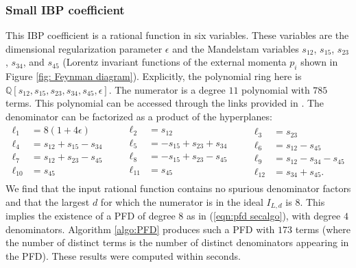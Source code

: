 \documentclass [a4paper,reqno, 11pt]{amsart}
\theoremstyle{plain}
\theoremstyle{plain}
\theoremstyle{plain}
\theoremstyle{plain}
\theoremstyle{definition}
\theoremstyle{definition}
\theoremstyle{definition}
\theoremstyle{definition}
\theoremstyle{definition}
\theoremstyle{definition}
\begin{document}
\subsubsection{Small IBP coefficient}
This IBP coefficient is a rational function in six variables. These variables are the dimensional regularization parameter $\epsilon$ and the Mandelstam variables $s_{12}$, $s_{15}$, $s_{23}$, $s_{34}$, and $s_{45}$ (Lorentz invariant functions of the external momenta $p_i$ shown in Figure \ref{fig: Feynman diagram}). 
Explicitly, the polynomial ring here is $\mathbb{Q}[s_{12},s_{15},s_{23},s_{34},s_{45},\epsilon]$.
The numerator is a degree $11$ polynomial with $785$ terms. This polynomial can be accessed through the links provided in \cite{BBD+}. The denominator can be factorized as a product of the hyperplanes:
\begin{equation*}
    \begin{aligned}
    \ell_1&=8(1+4\epsilon)\\
    \ell_4&=s_{12}+s_{15}-s_{34}\\
    \ell_7&=s_{12}+s_{23}-s_{45}\\
    \ell_{10}&=s_{45}\\
\end{aligned}
\quad\quad
\begin{aligned}
    \ell_2&=s_{12}\\
    \ell_5&=-s_{15}+s_{23}+s_{34}\\
    \ell_8&=-s_{15}+s_{23}-s_{45}\\
    \ell_{11}&=s_{45}\\
\end{aligned}
\quad\quad
\begin{aligned}
    \ell_3&=s_{23}\\
    \ell_6&=s_{12}-s_{45}\\
    \ell_9&=s_{12}-s_{34}-s_{45}\\
    \ell_{12}&=s_{34}+s_{45}.
\end{aligned}
\end{equation*}
We find that the input rational function contains no spurious denominator factors and that the largest $d$ for which the numerator is in the ideal $I_{L,d}$ is $8$. This implies the existence of a PFD of degree $8$ as in (\ref{eqn:pfd secalgo}), with degree $4$ denominators. Algorithm \ref{algo:PFD} produces such a PFD with $173$ terms (where the number of distinct terms is the number of distinct denominators appearing in the PFD). These results were computed within seconds. 
\end{document}
